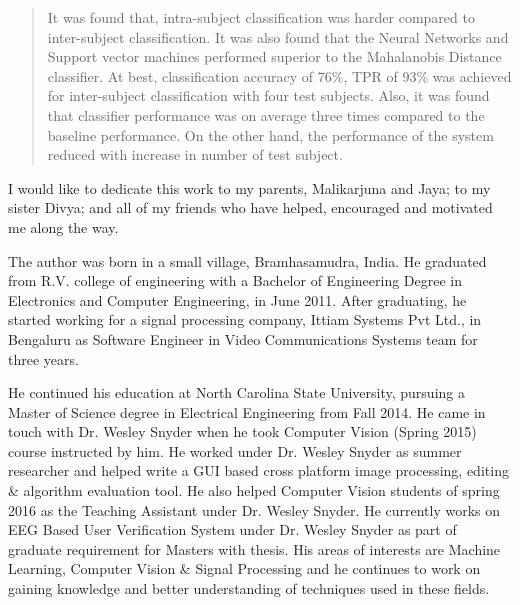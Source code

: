 \begin{abstract}
	It was found that, intra-subject classification was harder compared to inter-subject classification. It was also found that the Neural Networks and Support vector machines performed superior to the Mahalanobis Distance classifier. At best, classification accuracy of 76\%, TPR of 93\% was achieved for inter-subject classification with four test subjects. Also, it was found that classifier performance was on average three times compared to the baseline performance. On the other hand, the performance of the system reduced with increase in number of test subject.


\end{abstract}


\makecopyrightpage

\maketitlepage

\begin{dedication}
 I would like to dedicate this work to my parents, Malikarjuna and Jaya; to my sister Divya; and all of my friends who have helped, encouraged and motivated me along the way.
\end{dedication}

\begin{biography}
The author was born in a small village, Bramhasamudra, India. He graduated from R.V. college of engineering with a Bachelor of Engineering Degree in Electronics and Computer Engineering, in June 2011. After graduating, he started working for a signal processing company, Ittiam Systems Pvt Ltd., in Bengaluru as Software Engineer in Video Communications Systems team for three years.

He continued his education at North Carolina State University, pursuing a Master of Science degree in Electrical Engineering from Fall 2014. He came in touch with Dr. Wesley Snyder when he took Computer Vision (Spring 2015) course instructed by him. He worked under Dr. Wesley Snyder as summer researcher and helped write a GUI based cross platform image processing, editing \& algorithm evaluation tool. He also helped Computer Vision students of spring 2016 as the Teaching Assistant under Dr. Wesley Snyder. He currently works on EEG Based User Verification System under Dr. Wesley Snyder as part of graduate requirement for Masters with thesis. His areas of interests are Machine Learning, Computer Vision \& Signal Processing and he continues to work on gaining knowledge and better understanding of techniques used in these fields.
\end{biography}

